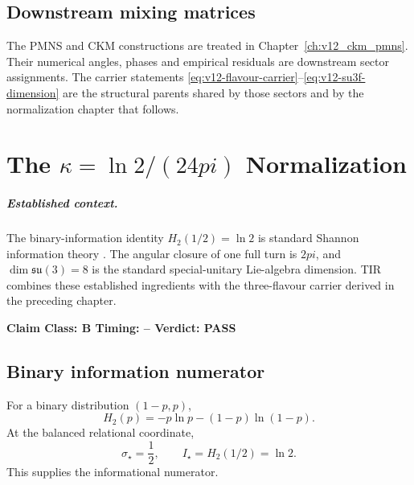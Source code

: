 \documentclass[11pt,a4paper,twoside]{book}
\def\pi{pi}%
\theoremstyle{definition}
\newcommand{\vTwelveStatus}[3]{\par\noindent\textbf{Claim Class: #1 \quad Timing: #2 \quad Verdict: #3}\par}
\begin{document}
\section{Downstream mixing matrices}
The PMNS and CKM constructions are treated in
Chapter~\ref{ch:v12_ckm_pmns}.  Their numerical angles, phases and empirical
residuals are downstream sector assignments.  The carrier statements
\eqref{eq:v12-flavour-carrier}--\eqref{eq:v12-su3f-dimension} are the structural
parents shared by those sectors and by the normalization chapter that follows.

\clearpage

\chapter[The Kappa Normalization]{The \texorpdfstring{$\kappa=\ln2/(24\pi)$}{kappa = ln2/(24 pi)} Normalization}
\label{ch:v12_kappa_normalization}

\paragraph{Established context.}
The binary-information identity $H_2(1/2)=\ln2$ is standard Shannon
information theory \cite{shannon1948,CoverThomas2006}.  The angular closure of
one full turn is $2\pi$, and $\dim\mathfrak{su}(3)=8$ is the standard
special-unitary Lie-algebra dimension.  TIR combines these established
ingredients with the three-flavour carrier derived in the preceding chapter.

\vTwelveStatus{B}{--}{PASS}

\section{Binary information numerator}
For a binary distribution $(1-p,p)$,
\[
H_2(p)=-p\ln p-(1-p)\ln(1-p).
\]
At the balanced relational coordinate,
\begin{equation}
\boxed{
\sigma_\star=\frac12,
\qquad
I_\star=H_2(1/2)=\ln2.
}
\label{eq:v12-kappa-binary-information}
\end{equation}
This supplies the informational numerator.
\end{document}
